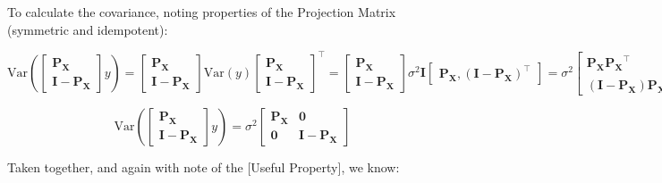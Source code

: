 \documentclass[
]{article}
\begin{document}
To calculate the covariance, noting properties of the Projection Matrix
(symmetric and idempotent):

\[
\text{Var} \left( 
\begin{bmatrix} 
\boldsymbol{P_X} \\ \boldsymbol{I} - \boldsymbol{P_X} 
\end{bmatrix} 
y \right)
= 
\begin{bmatrix} 
\boldsymbol{P_X} \\ \boldsymbol{I} - \boldsymbol{P_X} 
\end{bmatrix} 
\text{Var}(y) 
\begin{bmatrix} 
\boldsymbol{P_X} \\ \boldsymbol{I} - \boldsymbol{P_X} 
\end{bmatrix}^{\top}
= 
\begin{bmatrix} 
\boldsymbol{P_X} \\ \boldsymbol{I} - \boldsymbol{P_X} 
\end{bmatrix} 
\sigma^2 \boldsymbol{I} 
\begin{bmatrix} 
\boldsymbol{P_X}, (\boldsymbol{I} - \boldsymbol{P_X})^{\top} 
\end{bmatrix}
= \sigma^2 
\begin{bmatrix} 
\boldsymbol{P_X} \boldsymbol{P_X}^{\top} & \boldsymbol{P_X} (\boldsymbol{I} - \boldsymbol{P_X})^{\top} \\ 
(\boldsymbol{I} - \boldsymbol{P_X}) \boldsymbol{P_X}^{\top} & (\boldsymbol{I} - \boldsymbol{P_X}) (\boldsymbol{I} - \boldsymbol{P_X})^{\top} \end{bmatrix}
= \sigma^2 
\begin{bmatrix} \boldsymbol{P_X} & \boldsymbol{P_X} - \boldsymbol{P_X} \\ 
\boldsymbol{P_X} - \boldsymbol{P_X} & \boldsymbol{I} - \boldsymbol{P_X} - \boldsymbol{P_X} + \boldsymbol{P_X} 
\end{bmatrix}
\]

\[
\text{Var} \left( 
\begin{bmatrix} 
\boldsymbol{P_X} \\ \boldsymbol{I} - \boldsymbol{P_X} 
\end{bmatrix} 
y \right) 
= \sigma^2 
\begin{bmatrix} 
\boldsymbol{P_X} & \boldsymbol{0} \\ \boldsymbol{0} & \boldsymbol{I} - \boldsymbol{P_X} 
\end{bmatrix}
\]

Taken together, and again with note of the {[}Useful Property{]}, we
know:
\end{document}
